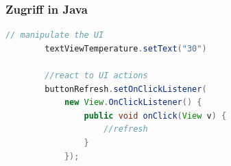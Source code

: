 \begin{frame}[fragile]
	\frametitle{Zugriff in Java}
	\begin{lstlisting}[language=Java]
		// manipulate the UI
		textViewTemperature.setText("30")

		//react to UI actions
		buttonRefresh.setOnClickListener(
		    new View.OnClickListener() {
		        public void onClick(View v) {
		            //refresh
		        }
		    });
    \end{lstlisting}
\end{frame}




